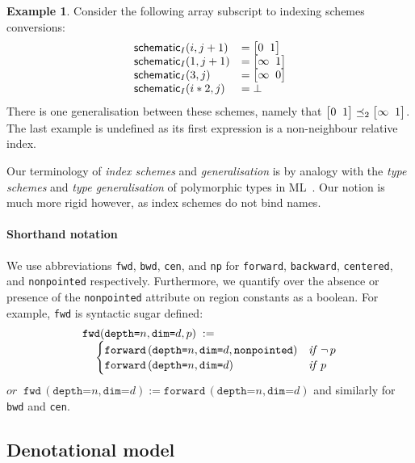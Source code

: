 \documentclass[10pt,preprint]{sigplanconf}
\newcounter{block}
\theoremstyle{definition}
\newtheorem{example}[block]{Example}
\newcommand{\term}[1]{\texttt{#1}}
\newcommand{\stenFwd}[3]{\term{forward} \, (\term{depth=}#1,
  \term{dim=}#2{#3})}
\newcommand{\irrefl}{\texttt{nonpointed}}
\newcommand{\stenFwdS}[2]{\term{fwd} \, (\term{depth=}#1,
  \term{dim=}#2)}
\newcommand{\irreflS}{\texttt{np}}
\newcommand{\stenFwdSR}[3]{\term{fwd} (\term{depth=}#1,
  \term{dim=}#2, #3)}
\newcommand{\vtwoh}[2]{\setlength{\arraycolsep}{0em}
\left[\begin{array}{cc}#1 \; & \; #2\end{array}\right]}
\begin{document}
\begin{example}
Consider the following array subscript to indexing schemes
conversions:
%
\begin{align*}
\begin{array}{ll}
\schemeN{(i, j+1)} & =\vtwoh{0}{1} \\
\schemeN{(1, j+1)} & = \vtwoh{\infty}{1} \\
\schemeN{(3, j)} & = \vtwoh{\infty}{0} \\
\schemeN{(i*2, j)} & = \bot
\end{array}
\end{align*}
There is one generalisation between these
schemes, namely that $\vtwoh{0}{1} \preceq_2 \vtwoh{\infty}{1}$.
The last example is undefined as its first expression is a
non-neighbour relative index.
\end{example}

Our terminology of \emph{index schemes} and
\emph{generalisation} is by analogy
with the \emph{type schemes} and \emph{type generalisation} of
polymorphic types in ML~\cite{milner1978theory}. Our notion is
much more rigid however, as index schemes do not bind names.

\paragraph{Shorthand notation}

We use abbreviations
 \term{fwd}, \term{bwd}, \term{cen}, and \irreflS{}
for \term{forward}, \term{backward},
\term{centered}, and \irrefl{} respectively. Furthermore, 
we quantify over the absence or presence of the \irrefl{}
attribute on region constants as a boolean. For example,
\term{fwd} is syntactic sugar defined:
\begin{align*}
\hspace{-0.5em}
& \stenFwdSR{n}{d}{p}
\; := \; \\[-0.4em]
& \quad \begin{cases}
\stenFwd{n}{d}{, \irrefl} & \textit{if} \;\, \neg \, p \\[-0.1em]
\stenFwd{n}{d}{}  & \textit{if} \;\,  p
\end{cases}
\end{align*}
%
$\textit{or} \;\; \stenFwdS{n}{d} := \stenFwd{n}{d}{}$
and similarly for \term{bwd} and \term{cen}.


\subsection{Denotational model}
\end{document}
